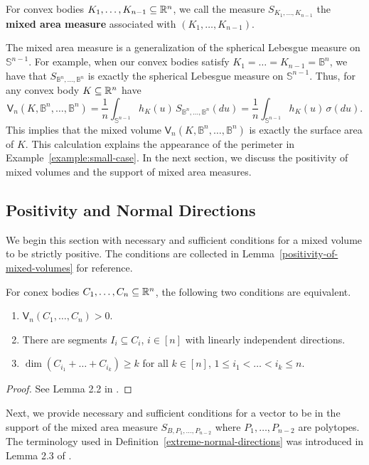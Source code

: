 \documentclass{puthesis-UG}
\begin{document}
\begin{defn} \label{def:mixed-area-measure}
	For convex bodies $K_1, \ldots, K_{n-1} \subseteq \mathbb{R}^n$, we call the measure $S_{K_1, \ldots, K_{n-1}}$ the \textbf{mixed area measure} associated with $(K_1, \ldots, K_{n-1})$. 
\end{defn}

The mixed area measure is a generalization of the spherical Lebesgue measure on $\mathbb{S}^{n-1}$. For example, when our convex bodies satisfy $K_1 = \ldots = K_{n-1} = \mathbb{B}^n$, we have that $S_{\mathbb{B}^n, \ldots, \mathbb{B}^n}$ is exactly the spherical Lebesgue measure on $\mathbb{S}^{n-1}$. Thus, for any convex body $K \subseteq \mathbb{R}^n$ have 
\[
	\mathsf{V}_n (K, \mathbb{B}^n, \ldots, \mathbb{B}^n ) = \frac{1}{n} \int_{\mathbb{S}^{n-1}} h_K(u) \, S_{\mathbb{B}^n, \ldots, \mathbb{B}^n} (du) = \frac{1}{n} \int_{\mathbb{S}^{n-1}} h_K(u) \, \sigma (du). 
\]
This implies that the mixed volume $\mathsf{V}_n (K, \mathbb{B}^n, \ldots, \mathbb{B}^n)$ is exactly the surface area of $K$. This calculation explains the appearance of the perimeter in Example~\ref{example:small-case}. In the next section, we discuss the positivity of mixed volumes and the support of mixed area measures. 

\subsection{Positivity and Normal Directions}

We begin this section with necessary and sufficient conditions for a mixed volume to be strictly positive. The conditions are collected in Lemma~\ref{positivity-of-mixed-volumes} for reference.

\begin{lem} \label{positivity-of-mixed-volumes}
	For conex bodies $C_1, \ldots, C_n \subseteq \mathbb{R}^n$, the following two conditions are equivalent.
	\begin{enumerate}[label = (\alph*)]
		\item $\mathsf{V}_n (C_1, \ldots, C_n) > 0$. 
		\item There are segments $I_i \subseteq C_i$, $i \in [n]$ with linearly independent directions. 
		\item $\dim (C_{i_1} + \ldots + C_{i_k}) \geq k$ for all $k \in [n]$, $1 \leq i_1 < \ldots < i_k \leq n$. 
	\end{enumerate}
\end{lem}
\begin{proof}
	See Lemma 2.2 in \cite{shenfeld2022extremals}. 
\end{proof}
Next, we provide necessary and sufficient conditions for a vector to be in the support of the mixed area measure $S_{B, P_1, \ldots, P_{n-2}}$ where $P_1, \ldots, P_{n-2}$ are polytopes. The terminology used in Definition~\ref{extreme-normal-directions} was introduced in Lemma 2.3 of \cite{shenfeld2022extremals}. 
\end{document}
